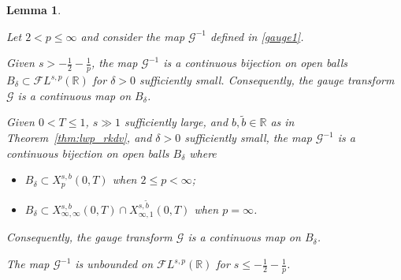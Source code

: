 \documentclass[a4paper,
11pt,  reqno]{amsart}
\newcommand{\5}{\textup{V}}
\newcommand{\noi}{\noindent}
\newcommand{\FL}{\mathcal{F} L}
\newcommand{\dl}{\delta}
\newcommand{\wt}{\widetilde}
\newtheorem{lemma}[theorem]{Lemma}
\theoremstyle{remark}
\newcommand{\R}{\mathbb{R}}
\newcommand{\Gc}{\mathcal{G}}
\numberwithin{equation}{section}
\numberwithin{theorem}{section}
\begin{document}
\begin{lemma}\label{LEM:D}

Let $2<p\le \infty$ and consider the map  $\Gc^{-1}$ defined in \eqref{gauge1}.

\smallskip



\noi {\rm(i)}
Given $s>-\frac12 - \frac1p$, the map  $\Gc^{-1}$ is a continuous bijection on open balls $B_\dl \subset  \FL^{s,p}(\R)$ for $\dl>0$ sufficiently small. 
Consequently, the gauge transform $\Gc$ is a continuous map on $B_\dl$. 

\smallskip 
\noi {\rm(ii)}
Given $0<T\le 1$, {$s\gg1$ sufficiently large},
and $b,\wt{b}\in\R$ as in Theorem~\ref{thm:lwp_rkdv}, and $\dl>0$ sufficiently small,
the map  $\Gc^{-1}$ is a continuous bijection on open balls $B_\dl$ where 
\begin{itemize}
\item $B_\dl \subset  X^{s,b}_{p}(0,T)$ when $2 \le p < \infty$;

\item $B_\dl \subset  X^{s,b}_{\infty, \infty}(0,T) \cap X^{s, \wt{b}}_{\infty, 1}(0,T)$ when $p=\infty$.
\end{itemize}
Consequently, the gauge transform $\Gc$ is a continuous map on $B_\dl$. 


\smallskip
\noi {\rm(iii)} The map $\Gc^{-1}$ is unbounded on $\FL^{s,p}(\R)$ for $s\le - \frac12 - \frac1p$. 

    
\end{lemma}
\end{document}
